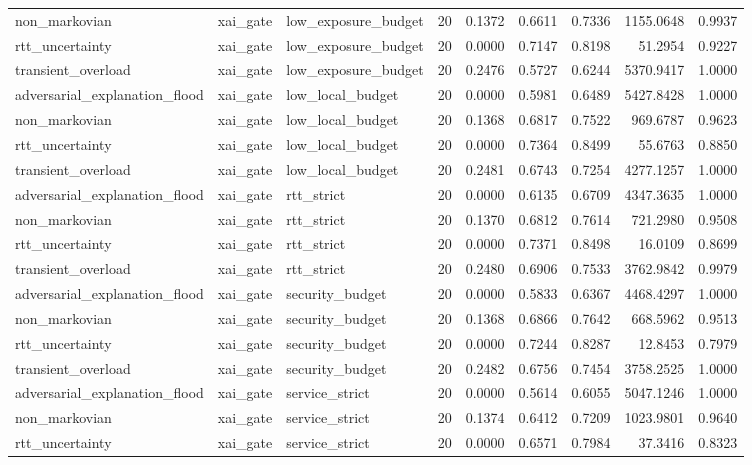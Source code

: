 \begin{table}[t]
\begin{tabular}{lllrrrrrr}
non\_markovian & xai\_gate & low\_exposure\_budget & 20 & 0.1372 & 0.6611 & 0.7336 & 1155.0648 & 0.9937 \\
rtt\_uncertainty & xai\_gate & low\_exposure\_budget & 20 & 0.0000 & 0.7147 & 0.8198 & 51.2954 & 0.9227 \\
transient\_overload & xai\_gate & low\_exposure\_budget & 20 & 0.2476 & 0.5727 & 0.6244 & 5370.9417 & 1.0000 \\
adversarial\_explanation\_flood & xai\_gate & low\_local\_budget & 20 & 0.0000 & 0.5981 & 0.6489 & 5427.8428 & 1.0000 \\
non\_markovian & xai\_gate & low\_local\_budget & 20 & 0.1368 & 0.6817 & 0.7522 & 969.6787 & 0.9623 \\
rtt\_uncertainty & xai\_gate & low\_local\_budget & 20 & 0.0000 & 0.7364 & 0.8499 & 55.6763 & 0.8850 \\
transient\_overload & xai\_gate & low\_local\_budget & 20 & 0.2481 & 0.6743 & 0.7254 & 4277.1257 & 1.0000 \\
adversarial\_explanation\_flood & xai\_gate & rtt\_strict & 20 & 0.0000 & 0.6135 & 0.6709 & 4347.3635 & 1.0000 \\
non\_markovian & xai\_gate & rtt\_strict & 20 & 0.1370 & 0.6812 & 0.7614 & 721.2980 & 0.9508 \\
rtt\_uncertainty & xai\_gate & rtt\_strict & 20 & 0.0000 & 0.7371 & 0.8498 & 16.0109 & 0.8699 \\
transient\_overload & xai\_gate & rtt\_strict & 20 & 0.2480 & 0.6906 & 0.7533 & 3762.9842 & 0.9979 \\
adversarial\_explanation\_flood & xai\_gate & security\_budget & 20 & 0.0000 & 0.5833 & 0.6367 & 4468.4297 & 1.0000 \\
non\_markovian & xai\_gate & security\_budget & 20 & 0.1368 & 0.6866 & 0.7642 & 668.5962 & 0.9513 \\
rtt\_uncertainty & xai\_gate & security\_budget & 20 & 0.0000 & 0.7244 & 0.8287 & 12.8453 & 0.7979 \\
transient\_overload & xai\_gate & security\_budget & 20 & 0.2482 & 0.6756 & 0.7454 & 3758.2525 & 1.0000 \\
adversarial\_explanation\_flood & xai\_gate & service\_strict & 20 & 0.0000 & 0.5614 & 0.6055 & 5047.1246 & 1.0000 \\
non\_markovian & xai\_gate & service\_strict & 20 & 0.1374 & 0.6412 & 0.7209 & 1023.9801 & 0.9640 \\
rtt\_uncertainty & xai\_gate & service\_strict & 20 & 0.0000 & 0.6571 & 0.7984 & 37.3416 & 0.8323 \\

\end{tabular}
\end{table}

